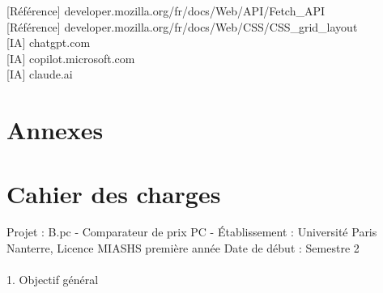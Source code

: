 \documentclass[a4paper, 12pt, twoside]{article}
\begin{document}
[Référence] developer.mozilla.org/fr/docs/Web/API/Fetch\_API \\

[Référence] developer.mozilla.org/fr/docs/Web/CSS/CSS\_grid\_layout \\

[IA] chatgpt.com \\

[IA] copilot.microsoft.com \\

[IA] claude.ai\\



\newpage
\section{Annexes}
\appendix
\makeatletter
\def\@seccntformat#1{Annexe~\csname the#1\endcsname:\quad}
\makeatother
	\section{Cahier des charges}
Projet : B.pc -  Comparateur de prix PC - Établissement : Université Paris Nanterre, Licence MIASHS première année Date de début : Semestre 2\\
\\
1. Objectif général\\
\end{document}
